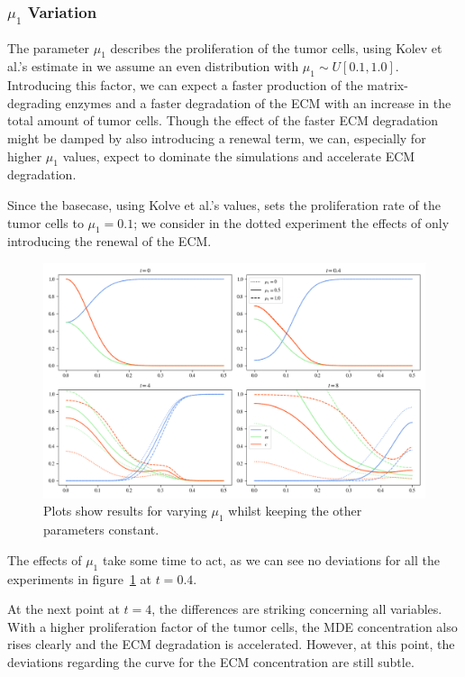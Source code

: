 \subsubsection*{$\mu_1$ Variation}
The parameter $\mu_1$ describes the proliferation of the tumor cells, using Kolev et al.'s estimate in \cite{Kolev2010} we assume an even distribution with $\mu_1 \sim U[0.1, 1.0]$. Introducing this factor, we can expect a faster production of the matrix-degrading enzymes and a faster degradation of the ECM with an increase in the total amount of tumor cells. Though the effect of the faster ECM degradation might be damped by also introducing a renewal term, we can, especially for higher $\mu_1$ values, expect to dominate the simulations and accelerate ECM degradation.

Since the basecase, using Kolve et al.'s values, sets the proliferation rate of the tumor cells to $\mu_1=0.1$; we consider in the dotted experiment the effects of only introducing the renewal of the ECM.

\begin{figure}[h!]
 \centering
 \includegraphics[width=\textwidth]{resources/images/prolif_mu_1_variation.png}
 \caption{Plots show results for varying $\mu_1$ whilst keeping the other parameters constant.}
 \label{fig:prolif_mu_1_variation}
\end{figure}
The effects of $\mu_1$ take some time to act, as we can see no deviations for all the experiments in figure~\ref{fig:prolif_mu_1_variation} at $t=0.4$.

At the next point at $t=4$, the differences are striking concerning all variables. With a higher proliferation factor of the tumor cells, the MDE concentration also rises clearly and the ECM degradation is accelerated. However, at this point, the deviations regarding the curve for the ECM concentration are still subtle.


